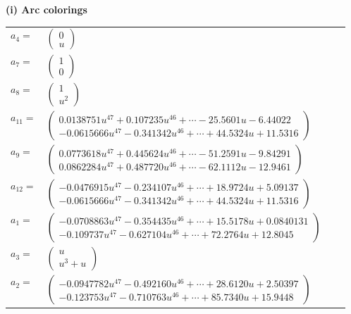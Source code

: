 \documentclass[1p]{elsarticle_modified}
\theoremstyle{definition}
\begin{document}
\flushleft \textbf{(i) Arc colorings}\\
\begin{tabular}{m{7pt} m{180pt} m{7pt} m{180pt} }
\flushright $a_{4}=$&$\begin{pmatrix}0\\u\end{pmatrix}$ \\
\flushright $a_{7}=$&$\begin{pmatrix}1\\0\end{pmatrix}$ \\
\flushright $a_{8}=$&$\begin{pmatrix}1\\u^2\end{pmatrix}$ \\
\flushright $a_{11}=$&$\begin{pmatrix}0.0138751 u^{47}+0.107235 u^{46}+\cdots-25.5601 u-6.44022\\-0.0615666 u^{47}-0.341342 u^{46}+\cdots+44.5324 u+11.5316\end{pmatrix}$ \\
\flushright $a_{9}=$&$\begin{pmatrix}0.0773618 u^{47}+0.445624 u^{46}+\cdots-51.2591 u-9.84291\\0.0862284 u^{47}+0.487720 u^{46}+\cdots-62.1112 u-12.9461\end{pmatrix}$ \\
\flushright $a_{12}=$&$\begin{pmatrix}-0.0476915 u^{47}-0.234107 u^{46}+\cdots+18.9724 u+5.09137\\-0.0615666 u^{47}-0.341342 u^{46}+\cdots+44.5324 u+11.5316\end{pmatrix}$ \\
\flushright $a_{1}=$&$\begin{pmatrix}-0.0708863 u^{47}-0.354435 u^{46}+\cdots+15.5178 u+0.0840131\\-0.109737 u^{47}-0.627104 u^{46}+\cdots+72.2764 u+12.8045\end{pmatrix}$ \\
\flushright $a_{3}=$&$\begin{pmatrix}u\\u^3+u\end{pmatrix}$ \\
\flushright $a_{2}=$&$\begin{pmatrix}-0.0947782 u^{47}-0.492160 u^{46}+\cdots+28.6120 u+2.50397\\-0.123753 u^{47}-0.710763 u^{46}+\cdots+85.7340 u+15.9448\end{pmatrix}$ \\

\end{tabular}
\end{document}
